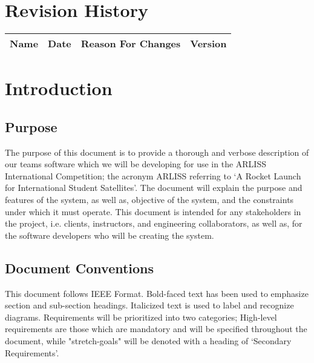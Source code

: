 \documentclass[10pt,onecolumn,draftclsnofoot,document]{IEEEtran}
\begin{document}
\clearpage


\section*{\hfill Revision History\hfill}
\begin{center}
    	\begin{tabular}{|c|c|c|c|}
        		\hline
	    		Name & Date & Reason For Changes & Version\\
        		\hline
    	\end{tabular}
\end{center}
\clearpage


\section{Introduction}

\subsection{Purpose}
The purpose of this document is to provide a thorough and verbose description of our teams software which we will be developing for use in the ARLISS International Competition; the acronym ARLISS referring to ‘A Rocket Launch for International Student Satellites’. The document will explain the purpose and features of the system, as well as, objective of the system, and the constraints under which it must operate. This document is intended for any stakeholders in the project, i.e. clients, instructors, and engineering collaborators, as well as, for the software developers who will be creating the system.

\subsection{Document Conventions}
This document follows IEEE Format. Bold-faced text has been used to emphasize section and sub-section headings. Italicized text is used to label and recognize diagrams. Requirements will be prioritized into two categories; High-level requirements are those which are mandatory and will be specified throughout the document, while "stretch-goals" will be denoted with a heading of ‘Secondary Requirements’.
\end{document}
